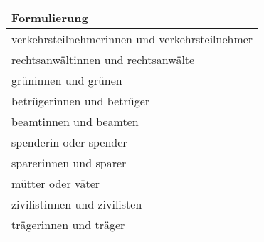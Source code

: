 
\begin{tabular}{l}
\toprule
Formulierung\\
\midrule
verkehrsteilnehmerinnen und verkehrsteilnehmer\\
rechtsanwältinnen und rechtsanwälte\\
grüninnen und grünen\\
betrügerinnen und betrüger\\
beamtinnen und beamten\\
spenderin oder spender\\
sparerinnen und sparer\\
mütter oder väter\\
zivilistinnen und zivilisten\\
trägerinnen und träger\\
\bottomrule
\end{tabular}